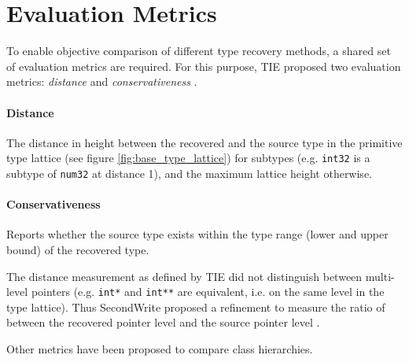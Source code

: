
\section{Evaluation Metrics}



To enable objective comparison of different type recovery methods, a shared set of evaluation metrics are required. For this purpose, TIE proposed two evaluation metrics: \textit{distance} and \textit{conservativeness} \cite{tie_reverse_engineering_of_types}.

\paragraph{Distance} The distance in height between the recovered and the source type in the primitive type lattice (see figure \ref{fig:base_type_lattice}) for subtypes (e.g. \texttt{int32} is a subtype of \texttt{num32} at distance 1), and the maximum lattice height otherwise.

\paragraph{Conservativeness} Reports whether the source type exists within the type range (lower and upper bound) of the recovered type.

The distance measurement as defined by TIE did not distinguish between multi-level pointers (e.g. \texttt{int*} and \texttt{int**} are equivalent, i.e. on the same level in the type lattice). Thus SecondWrite proposed a refinement to measure the ratio of between the recovered pointer level and the source pointer level \cite{second_write_scalable_type_detection}.

Other metrics have been proposed to compare class hierarchies.
